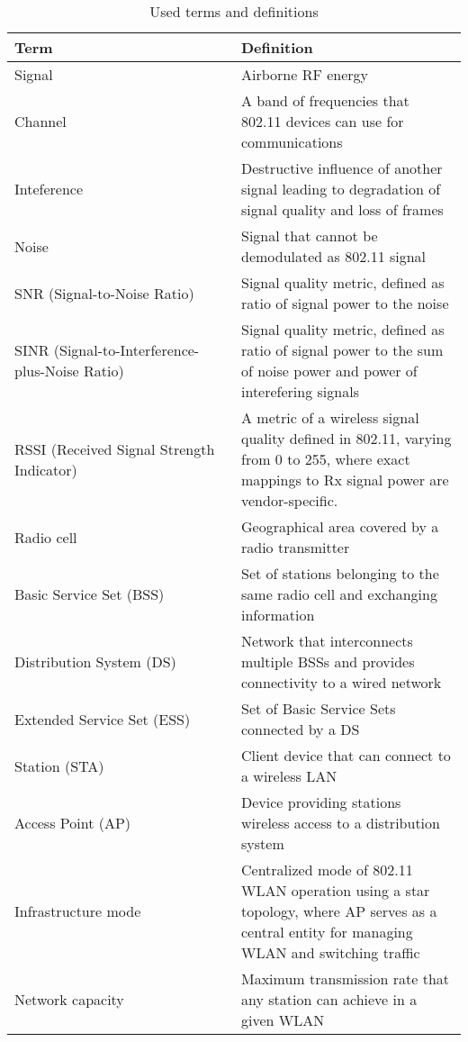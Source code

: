 \appendix

\makeatletter
\let\@currsize\normalsize
\makeatother
\label{appx:defs_table}
\begin{table}[h]
    \centering
    \begin{tabular}{| p{0.5\linewidth} | p{0.5\linewidth} |}\hline
        \textbf{Term} & \textbf{Definition} \\ \hline
        Signal & Airborne RF energy \\
        \hline
        Channel & A band of frequencies that 802.11 devices can use for communications \cite{AuthoritativeDictionaryIEEE2000} \\
        \hline
        Inteference & Destructive influence of another signal leading to degradation of signal quality and loss of frames \\
        \hline
        Noise & Signal that cannot be demodulated as 802.11 signal \\
        \hline
        SNR (Signal-to-Noise Ratio) & Signal quality metric, defined as ratio of signal power to the noise \\
        \hline
        SINR (Signal-to-Interference-plus-Noise Ratio) & Signal quality metric, defined as ratio of signal power to the sum of noise power and power of interefering signals \\
        \hline
        RSSI (Received Signal Strength Indicator) & A metric of a wireless signal quality defined in 802.11, varying from 0 to 255, where exact mappings to Rx signal power are vendor-specific. \\
        \hline
        Radio cell & Geographical area covered by a radio transmitter \cite{tanenbaumComputerNetworks2020} \\
        \hline
        Basic Service Set (BSS) & Set of stations belonging to the same radio cell and exchanging information \cite{konsgenSpectrumManagementAlgorithms2010} \\
        \hline
        Distribution System (DS) & Network that interconnects multiple BSSs and provides connectivity to a wired network \cite{konsgenSpectrumManagementAlgorithms2010} \\
        \hline
        Extended Service Set (ESS) & Set of Basic Service Sets connected by a DS \cite{konsgenSpectrumManagementAlgorithms2010} \\
        \hline
        Station (STA) & Client device that can connect to a wireless LAN \\
        \hline
        Access Point (AP) & Device providing stations wireless access to a distribution system \\
        \hline
        Infrastructure mode & Centralized mode of 802.11 WLAN operation using a star topology, where AP serves as a central entity for managing WLAN and switching traffic \\
        \hline
        Network capacity & Maximum transmission rate that any station can achieve in a given WLAN \\
        \hline
    \end{tabular}
    \caption{Used terms and definitions}
    \label{tab:my_label}
\end{table}

